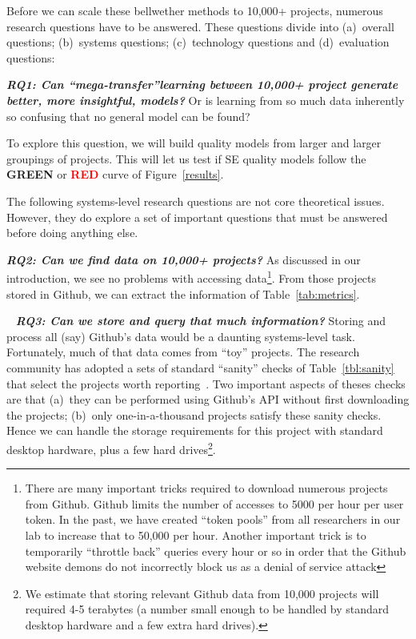  Before we can scale these bellwether methods to 10,000+ projects, numerous research questions have
to be answered. These questions divide into (a)~overall questions; (b)~systems questions; (c)~technology questions and (d)~evaluation questions: 




\textit{\textbf{ RQ1: Can ``mega-transfer''learning between 10,000+ project generate better, more insightful, models?}}  Or is learning from so much data inherently so confusing that no general model can be found?

To explore this question, we will build
quality models from larger and larger groupings of   projects.
This will let us test if   SE
quality models follow the \textcolor{ao(english)}{{\bf GREEN}} or  \textcolor{red}{{\bf RED}} curve of Figure~\ref{results}.


 
 
 
 

 
 
The following systems-level research questions are not core theoretical
issues. However, they do explore a set of
important questions  that must be answered before doing anything else.


\textit{\textbf{ RQ2: Can we find data on 10,000+ projects?}} As discussed
in our introduction, we see no problems with accessing  data\footnote{There are many
important tricks required to download numerous projects from Github. Github limits the number of accesses to 5000 per hour per user token. In the past, we have created ``token pools'' from all researchers in our lab to increase that to 50,000 per hour.
Another important trick is to temporarily
``throttle back'' queries every hour or so 
in order that the Github website demons do not incorrectly
block us as a denial of service attack}. From those projects stored in Github, we can extract the information
of Table~\ref{tab:metrics}.


~\textit{\textbf{ RQ3: Can we store and query that much information?}}
Storing and process all (say) Github's data would be a daunting
systems-level task.  Fortunately, much of that data comes from   ``toy'' projects. The research community has adopted a sets of standard ``sanity'' checks
of  Table~\ref{tbl:sanity}   that  select the projects worth reporting~\cite{5069475,Kalliamvakou2014,Munaiah2017}.  
Two important aspects of theses checks are that
(a)~they can be performed using Github's API without
first downloading the projects; (b)~only one-in-a-thousand projects satisfy these sanity
checks. Hence we can handle the storage requirements
for this project with standard desktop hardware, plus a few  hard drives\footnote{We estimate that storing relevant Github data from 10,000 projects will required 4-5 terabytes (a number small enough to be handled by standard desktop hardware and a few extra hard drives).}. 


